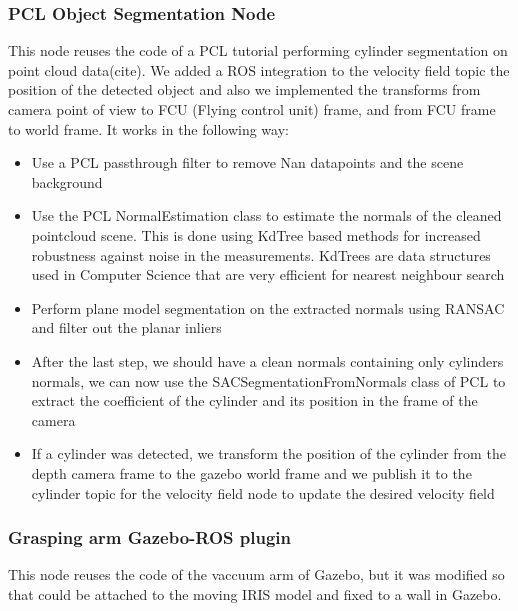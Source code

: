 \subsubsection{PCL Object Segmentation Node}
This node reuses the code of a PCL tutorial performing cylinder segmentation on point cloud data(cite). 
We added a ROS integration to the velocity field topic the position of the detected object and also we implemented the transforms from camera point of view to FCU (Flying control unit) frame, and from FCU frame to world frame. 
It works in the following way:
\begin{itemize}
    \item Use a PCL passthrough filter to remove Nan datapoints and the scene background
    \item Use the PCL NormalEstimation class to estimate the normals of the cleaned pointcloud scene. This is done using KdTree based methods for increased robustness against noise in the measurements. KdTrees are data structures used in Computer Science that are very efficient for nearest neighbour search
    \item Perform plane model segmentation on the extracted normals using RANSAC and filter out the planar inliers
    \item After the last step, we should have a clean normals containing only cylinders normals, we can now use the SACSegmentationFromNormals class of PCL to extract the coefficient of the cylinder and its position in the frame of the camera
    \item If a cylinder was detected, we transform the position of the cylinder from the depth camera frame to the gazebo world frame and we publish it to the cylinder topic for the velocity field node to update the desired velocity field
\end{itemize}
\subsubsection{Grasping arm Gazebo-ROS plugin}    
This node reuses the code of the vaccuum arm of Gazebo, but it was modified so that could be attached to the moving IRIS model and fixed to a wall in Gazebo. 


